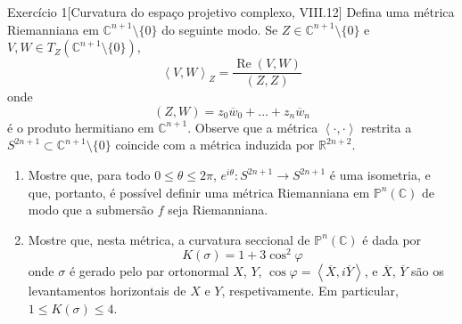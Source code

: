 \begin{thing6}{Exercício 1}[Curvatura do espaço projetivo complexo, \cite{doc} VIII.12]\label{exer:1}\leavevmode
Defina uma métrica Riemanniana  em \(\mathbb{C}^{n+1}\setminus\{0\}\) do seguinte modo. Se \(Z \in \mathbb{C}^{n+1}\setminus\{0\}\) e \(V,W \in T_Z (\mathbb{C}^{n+1}\setminus\{0\})\),
\[\left<V,W\right>_Z=\frac{\operatorname{Re}(V,W)}{(Z,Z)}\]
onde 
\[(Z,W)=z_0\overline{w}_0+\ldots+z_n\overline{w}_n\]
é o produto hermitiano em \(\mathbb{C}^{n+1}\). Observe que a métrica \(\left<\cdot,\cdot\right>\) restrita a \(S^{2n+1}\subset \mathbb{C}^{n+1}\setminus\{0\}\) coincide com a métrica induzida por \(\mathbb{R}^{2n+2}\).
\begin{enumerate}[label=(\alph*)]
\item Mostre que, para todo \(0\leq \theta \leq 2\pi\), \(e^{i\theta}:S^{2n+1}\to S^{2n+1}\) é uma isometria, e que, portanto, é possível definir uma métrica Riemanniana em \(\mathbb{P}^n(\mathbb{C})\) de modo que a submersão \(f\) seja Riemanniana.

\item Mostre que, nesta métrica, a curvatura seccional de \(\mathbb{P}^n(\mathbb{C})\) é dada por
\[\boxed{K(\sigma)=1+3\cos^2\varphi}\]
onde \(\sigma\) é gerado pelo par ortonormal \(X\), \(Y\), \(\cos \varphi=\left<\overline{X},i\overline{Y}\right>\), e \(\overline{X}\), \(\overline{Y}\) são os levantamentos horizontais de \(X\) e \(Y\), respetivamente. Em particular, \(1 \leq  K(\sigma) \leq  4\).
\end{enumerate}
\end{thing6}

